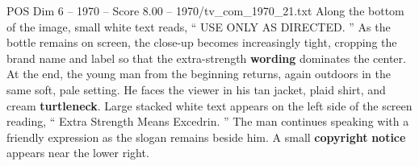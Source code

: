 \begin{textsample}{POS Dim 6 – 1970 – Score 8.00 – 1970/tv\_com\_1970\_21.txt}
Along the bottom of the image, small white text reads, “ USE ONLY AS DIRECTED. ” As the bottle remains on screen, the close-up becomes increasingly tight, cropping the brand name and label so that the extra-strength \textbf{wording} dominates the center.
At the end, the young man from the beginning returns, again outdoors in the same soft, pale setting.
He faces the viewer in his tan jacket, plaid shirt, and cream \textbf{turtleneck}.
Large stacked white text appears on the left side of the screen reading, “ Extra Strength Means Excedrin. ” The man continues speaking with a friendly expression as the slogan remains beside him.
A small \textbf{copyright} \textbf{notice} appears near the lower right.

\end{textsample}
